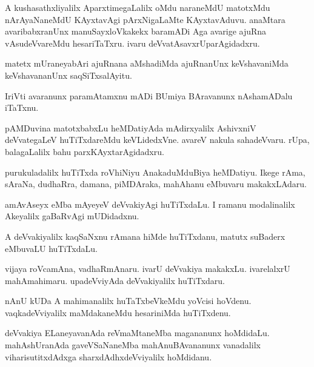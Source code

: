 \documentclass{article}
\begin{document}
\begin{mn}
A kushasathxliyalilx AparxtimegaLalilx oMdu naraneMdU matotxMdu
nArAyaNaneMdU KAyxtavAgi pArxNigaLaMte KAyxtavAduvu. anaMtara
avaribabxranUnx manuSayxloVkakekx baramADi Aga avarige ajuRna
vAsudeVvareMdu hesariTaTxru. ivaru deVvatAsavxrUparAgidadxru.
\end{mn}

\begin{mn}%
matetx mUraneyabAri ajuRnana aMshadiMda ajuRnanUnx keVshavaniMda
keVshavananUnx saqSiTxsalAyitu.
\end{mn}

\begin{mn}%
IriVti avaranunx paramAtamxnu mADi BUmiya BAravanunx nAshamADalu
iTaTxnu. 
\end{mn}

\begin{mn}
pAMDuvina matotxbabxLu heMDatiyAda mAdirxyalilx AshivxniV deVvategaLeV
huTiTxdareMdu keVLidedxVne. avareV nakula sahadeVvaru. rUpa,
balagaLalilx bahu parxKAyxtarAgidadxru.
\end{mn}

\begin{mn}
purukuladalilx huTiTxda roVhiNiyu AnakaduMduBiya heMDatiyu. Ikege
rAma, sAraNa, dudhaRra, damana, piMDAraka, mahAhanu eMbuvaru makakxLAdaru.
\end{mn}

\begin{mn}
amAvAseyx eMba mAyeyeV deVvakiyAgi huTiTxdaLu. I ramanu modalinalilx
Akeyalilx gaBaRvAgi mUDidadxnu.
\end{mn}

\begin{mn}%
A deVvakiyalilx kaqSaNxnu rAmana hiMde huTiTxdanu, matutx suBaderx
eMbuvaLU huTiTxdaLu.
\end{mn}

\begin{mn}%
vijaya roVcamAna, vadhaRmAnaru. ivarU deVvakiya makakxLu. ivarelalxrU
mahAmahimaru. upadeVviyAda deVvakiyalilx huTiTxdaru. 
\end{mn}

\begin{mn}
nAnU kUDa A mahimanalilx huTaTxbeVkeMdu yoVcisi
hoVdenu. vaqkadeVviyalilx maMdakaneMdu hesariniMda huTiTxdenu.
\end{mn}

\begin{mn}
deVvakiya ELaneyavanAda reVmaMtaneMba magananunx
hoMdidaLu. mahAshUranAda gaveVSaNaneMba mahAnuBAvananunx vanadalilx
viharisutitxdAdxga sharxdAdhxdeVviyalilx hoMdidanu.
\end{mn}
\end{document}

